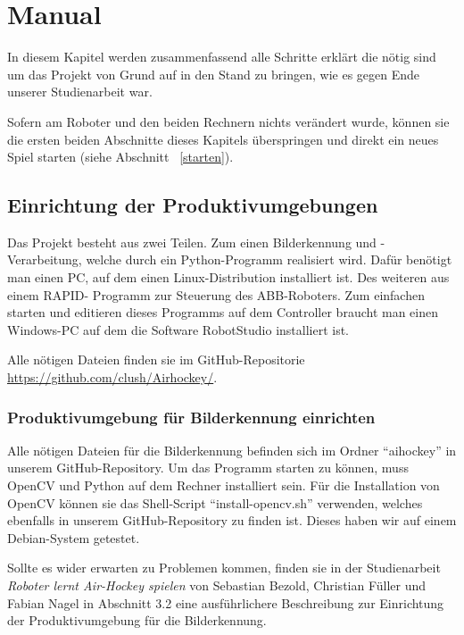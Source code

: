 
\chapter{Manual}

In diesem Kapitel werden zusammenfassend alle Schritte erklärt die nötig sind um das Projekt von Grund auf in den Stand zu bringen, wie es gegen Ende unserer Studienarbeit war.

Sofern am Roboter und den beiden Rechnern nichts verändert wurde, können sie die ersten beiden Abschnitte dieses Kapitels überspringen und direkt ein neues Spiel starten (siehe Abschnitt ~\ref{starten}). 

\section{Einrichtung der Produktivumgebungen}

Das Projekt besteht aus zwei Teilen. Zum einen Bilderkennung und -Verarbeitung, welche durch ein Python-Programm realisiert wird. Dafür benötigt man einen PC, auf dem einen Linux-Distribution installiert ist. Des weiteren aus einem RAPID- Programm zur Steuerung des ABB-Roboters. Zum einfachen starten und editieren dieses Programms auf dem Controller braucht man einen Windows-PC auf dem die Software RobotStudio installiert ist. 

Alle nötigen Dateien finden sie im GitHub-Repositorie \href{https://github.com/clush/Airhockey/}{https://github.com/clush/Airhockey/}.  

\subsection{Produktivumgebung für Bilderkennung einrichten}
Alle nötigen Dateien für die Bilderkennung befinden sich im Ordner \enquote{aihockey} in unserem GitHub-Repository. Um das Programm starten zu können, muss OpenCV und Python auf dem Rechner installiert sein. Für die Installation von OpenCV können sie das Shell-Script \enquote{install-opencv.sh} verwenden, welches ebenfalls in unserem GitHub-Repository zu finden ist. Dieses haben wir auf einem Debian-System getestet. 

Sollte es wider erwarten zu Problemen kommen, finden sie in der Studienarbeit \textit{Roboter lernt Air-Hockey spielen} von Sebastian Bezold, Christian Füller und Fabian Nagel in Abschnitt 3.2 eine ausführlichere Beschreibung zur Einrichtung der Produktivumgebung für die Bilderkennung.

